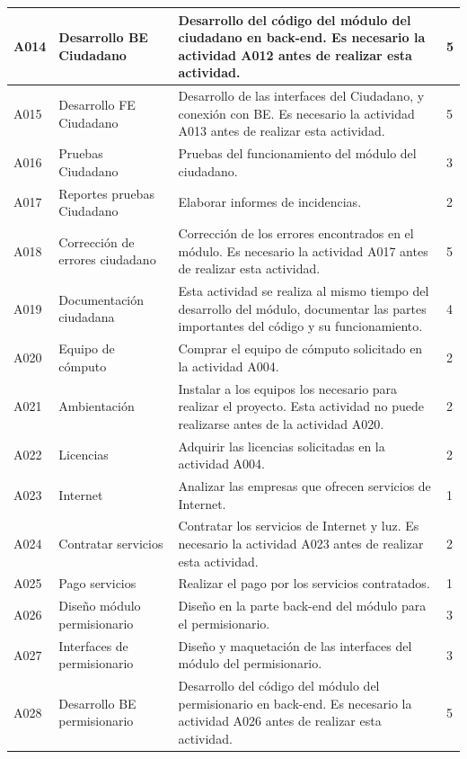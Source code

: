 \documentclass[12pt,twoside]{article}
\begin{document}
\begin{longtable}{|l|m{3cm}|m{6cm}|m{2cm}|}
    A014 & Desarrollo BE Ciudadano & Desarrollo del código del módulo del ciudadano en back-end. Es necesario la actividad A012 antes de realizar esta actividad. & 5 \\ \hline
    A015 & Desarrollo FE Ciudadano & Desarrollo de las interfaces del Ciudadano, y conexión con BE. Es necesario la actividad A013 antes de realizar esta actividad. & 5 \\ \hline
    A016 & Pruebas Ciudadano & Pruebas del funcionamiento del módulo del ciudadano. & 3 \\ \hline
    A017 & Reportes pruebas Ciudadano & Elaborar informes de incidencias. & 2 \\ \hline
    A018 & Corrección de errores ciudadano & Corrección de los errores encontrados en el módulo. Es necesario la actividad A017 antes de realizar esta actividad. & 5 \\ \hline
    A019 & Documentación ciudadana & Esta actividad se realiza al mismo tiempo del desarrollo del módulo, documentar las partes importantes del código y su funcionamiento. & 4 \\ \hline
    A020 & Equipo de cómputo & Comprar el equipo de cómputo solicitado en la actividad A004. & 2 \\ \hline
    A021 & Ambientación & Instalar a los equipos los necesario para realizar el proyecto. Esta actividad no puede realizarse antes de la actividad A020. & 2 \\ \hline
    A022 & Licencias & Adquirir las licencias solicitadas en la actividad A004. & 2 \\ \hline
    A023 & Internet & Analizar las empresas que ofrecen servicios de Internet. & 1 \\ \hline
    A024 & Contratar servicios & Contratar los servicios de Internet y luz. Es necesario la actividad A023 antes de realizar esta actividad. & 2 \\ \hline
    A025 & Pago servicios & Realizar el pago por los servicios contratados. & 1 \\ \hline
    A026 & Diseño módulo permisionario & Diseño en la parte back-end del módulo para el permisionario. & 3 \\ \hline
    A027 & Interfaces de permisionario & Diseño y maquetación de las interfaces del módulo del permisionario. & 3 \\ \hline
    A028 & Desarrollo BE permisionario & Desarrollo del código del módulo del permisionario en back-end. Es necesario la actividad A026 antes de realizar esta actividad. & 5 \\ \hline

\end{longtable}
\end{document}
